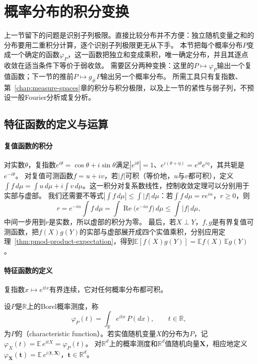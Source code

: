 \section{概率分布的积分变换}
\label{sec:wlim-characteristic}

上一节留下的问题是识别子列极限。直接比较分布并不方便：独立随机变量之和的分布要用二重积分计算，逐个识别子列极限更无从下手。
本节把每个概率分布$P$变成一个确定的函数$\varphi_P$，这一函数把独立和变成乘积，唯一确定分布，并且其逐点收敛在适当条件下等价于弱收敛。
需要区分两种变换：这里的$P\mapsto\varphi_P$输出一个复值函数；下一节的推前$P\mapsto g_\#P$输出另一个概率分布。
所需工具只有复指数、第~\ref{chap:measure-spaces}章的积分与积分极限，以及上一节的紧性与弱子列，不预设一般Fourier分析或复分析。

\subsection{特征函数的定义与运算}

\paragraph{复值函数的积分}
对实数$\theta$，复指数$e^{i\theta}=\cos\theta+i\sin\theta$满足$|e^{i\theta}|=1$、$e^{i(\theta+\eta)}=e^{i\theta}e^{i\eta}$，其共轭是$e^{-i\theta}$。
对复值可测函数$f=u+iv$，若$|f|$可积（等价地，$u$与$v$都可积），定义$\int f\,d\mu=\int u\,d\mu+i\int v\,d\mu$。这一积分对复系数线性，控制收敛定理可以分别用于实部与虚部。
我们还需要不等式$|\int f\,d\mu|\leq\int|f|\,d\mu$：若$\int f\,d\mu=re^{i\alpha}$，$r\geq0$，则
\[
  r=e^{-i\alpha}\int f\,d\mu=\int\operatorname{Re}\bigl(e^{-i\alpha}f\bigr)\,d\mu\leq\int|f|\,d\mu,
\]
中间一步用到$r$是实数，所以虚部的积分为零。
最后，若$X\perp Y$，$f,g$是有界复值可测函数，把$f(X)g(Y)$的实部与虚部展开成四个实值乘积，分别应用定理~\ref{thm:pmod-product-expectation}，得到$\mathbb E[f(X)g(Y)]=\mathbb E f(X)\,\mathbb E g(Y)$。

\paragraph{特征函数的定义}
复指数$x\mapsto e^{itx}$有界连续，它对任何概率分布都可积。

\begin{definition}[特征函数]
\label{def:wlim-characteristic}
设$P$是$\mathbb R$上的Borel概率测度，称
\[
  \varphi_P(t)=\int_{\mathbb R}e^{itx}\,P(dx),\qquad t\in\mathbb R,
\]
为$P$的（characteristic function）。若实值随机变量$X$的分布为$P$，记$\varphi_X(t)=\mathbb E\,e^{itX}=\varphi_P(t)$。
对$\mathbb R^d$上的概率测度和$\mathbb R^d$值随机向量$\bm X$，相应地定义$\varphi_{\bm X}(\bm t)=\mathbb E\,e^{i\langle\bm t,\bm X\rangle}$，$\bm t\in\mathbb R^d$。
\end{definition}

